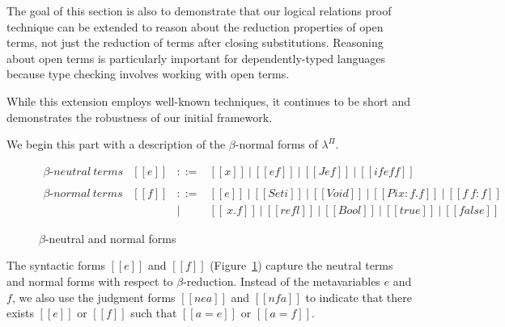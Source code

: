 \documentclass[\ifpublic nolinenum\else\fi,online,OA]{jfp}
\newcommand{\scw}[1]{}
\newcommand{\yl}[1]{}
\newcommand{\dotv}[2]{\href{#1}{\texttt{#1}}{\texttt{:#2}}}
\newcommand{\lang}{$\lambda^{\Pi}$\xspace}
\theoremstyle{definition}
\begin{document}
The goal of this section is also to demonstrate that our logical relations
proof technique can be extended to reason about the reduction properties of
open terms, not just the reduction of terms after closing substitutions.
Reasoning about open terms is particularly important for dependently-typed
languages because type checking involves working with open terms.
\scw{
  Add when we can find a reference:
  However, even non dependently-typed languages employ such techniques,
  especially in the case of relational semantics.
}
While this extension employs well-known techniques, it continues to be short and
demonstrates the robustness of our initial framework.

We begin this part with a description of the $\beta$-normal forms
of \lang{}.
%
\begin{figure}[H]
  \[
    \begin{array}{llcl}
       \beta\text{-}\mathit{neutral\ terms} &
      [[e]] & ::= & [[x]]\ |\ [[e f]]\ |\ [[J e f]]\ |\ [[if e f
                    f]] \\ \\
      \beta\text{-}\mathit{normal\ terms} &
      [[f]] & ::= & [[e]]\ |\ [[Set i]]\ |\ [[Void]]\ |\ [[Pi x : f . f]]\
                    |\ [[f ~ f : f]]\\
            & & |   & [[\ x . f]]\ |\ [[refl]]\ |\ [[Bool]]\ |\ [[true]]\ |\ [[false]]
    \end{array}
  \]
  \caption{$\beta$-neutral and normal forms}
  \label{fig:nenf}
\end{figure}
%
The syntactic forms $[[e]]$ and $[[f]]$ (Figure~\ref{fig:nenf}) capture the
neutral terms and normal forms with respect to $\beta$-reduction\scw{Why not say parallel reduction here? We can be specific and say that that the only reductions available for these terms are identity reductions and cite
\footnote{\dotv{normalform.v}{nf\_refl}} }.\yl{I always think of
normal form as the specific definition that says the relation can't
step. We can refer to nfrefl but that requires some explanation about
the definition of normal form and the complication that it doesn't
hold in $\eta$ (maybe it's fine if we just don't mention it in the
$\eta$ case)}\scw{A terminal form is a syntactic characterization of terms that don't step 
according to a particular relation. A normal form is a terminal form of a normalizing relation.}
 Instead of the
metavariables $e$ and $f$, we also
use the judgment forms $[[ne a]]$ and $[[nf a]]$ to indicate that there exists
$[[e]]$ or $[[f]]$ such that $[[a = e]]$ or $[[a = f]]$.
\end{document}
